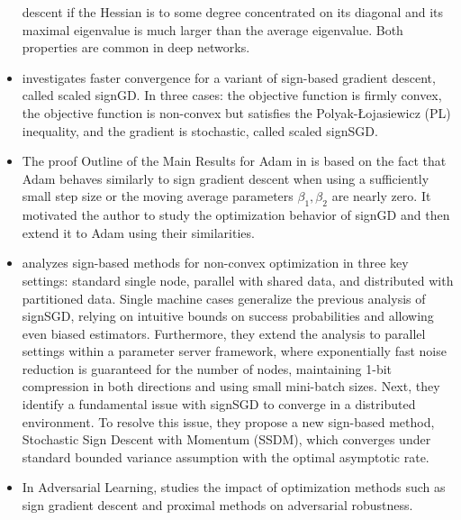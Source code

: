 \documentclass[11pt]{book}
\begin{document}
\begin{itemize}
descent if the Hessian is to some degree concentrated on its diagonal
and its maximal eigenvalue is much larger than the average eigenvalue.
Both properties are common in deep networks.
\item \cite{li2021faster}
investigates faster convergence for a variant of sign-based gradient
descent, called scaled signGD. In three cases: the objective function
is firmly convex, the objective function is non-convex but satisfies
the Polyak-\L ojasiewicz (PL) inequality, and the gradient is stochastic,
called scaled signSGD.
\item The proof Outline of the Main Results for Adam
in \cite{zou2021understanding}
is based on the fact that Adam behaves similarly to sign gradient
descent when using a sufficiently small step size or the moving average
parameters $\beta_{1},\beta_{2}$ are nearly zero. It motivated the
author to study the optimization behavior of signGD and then extend
it to Adam using their similarities. 
\item \cite{safaryan2021stochastic}
analyzes sign-based methods for non-convex optimization in three key
settings: standard single node, parallel with shared data, and distributed
with partitioned data. Single machine cases generalize the previous
analysis of signSGD, relying on intuitive bounds on success probabilities
and allowing even biased estimators. Furthermore, they extend the
analysis to parallel settings within a parameter server framework,
where exponentially fast noise reduction is guaranteed for the number
of nodes, maintaining 1-bit compression in both directions and using
small mini-batch sizes. Next, they identify a fundamental issue with
signSGD to converge in a distributed environment. To resolve this
issue, they propose a new sign-based method, Stochastic Sign Descent
with Momentum (SSDM), which converges under standard bounded variance
assumption with the optimal asymptotic rate.

\item In Adversarial Learning, \cite{faghri2021bridging}
studies the impact of optimization methods such as sign gradient descent
and proximal methods on adversarial robustness.
\end{itemize}
\end{document}
